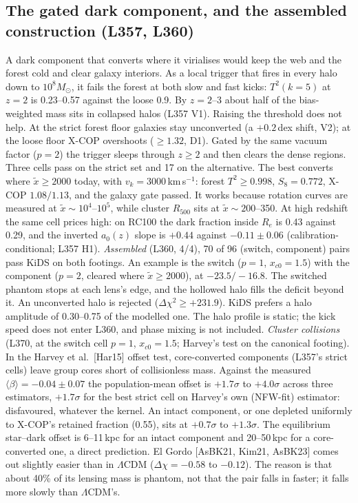 \documentclass[10pt]{article}
\begin{document}
\subsection{The gated dark component, and the assembled construction (L357, L360)}
A dark component that converts where it virialises would keep the web and the forest cold and clear galaxy interiors. As a local trigger that fires in every halo down to $10^8M_\odot$, it fails the forest at both slow and fast kicks: $T^2(k=5)$ at $z=2$ is 0.23--0.57 against the loose 0.9. By $z=2$--3 about half of the bias-weighted mass sits in collapsed halos (L357 V1). Raising the threshold does not help. At the strict forest floor galaxies stay unconverted (a $+0.2$\,dex shift, V2); at the loose floor X-COP overshoots ($\geq1.32$, D1).
Gated by the same vacuum factor ($p=2$) the trigger sleeps through $z\geq2$ and then clears the dense regions. Three cells pass on the strict set and 17 on the alternative. The best converts where $\tilde x\geq2000$ today, with $v_k=3000$\,km\,s$^{-1}$: forest $T^2\geq0.998$, $S_8=0.772$, X-COP $1.08/1.13$, and the galaxy gate passed. It works because rotation curves are measured at $\tilde x\sim10^4$--$10^5$, while cluster $R_{500}$ sits at $\tilde x\sim200$--350. At high redshift the same cell prices high: on RC100 the dark fraction inside $R_e$ is 0.43 against 0.29, and the inverted $a_0(z)$ slope is $+0.44$ against $-0.11\pm0.06$ (calibration-conditional; L357 H1).
\emph{Assembled} (L360, 4/4), 70 of 96 (switch, component) pairs pass KiDS on both footings. An example is the switch ($p=1$, $x_{c0}=1.5$) with the component ($p=2$, cleared where $\tilde x\geq2000$), at $-23.5/-16.8$. The switched phantom stops at each lens's edge, and the hollowed halo fills the deficit beyond it. An unconverted halo is rejected ($\Delta\chi^2\geq+231.9$). KiDS prefers a halo amplitude of 0.30--0.75 of the modelled one. The halo profile is static; the kick speed does not enter L360, and phase mixing is not included.
\emph{Cluster collisions} (L370, at the switch cell $p=1$, $x_{c0}=1.5$; Harvey's test on the canonical footing). In the Harvey et al.\ [Har15] offset test, core-converted components (L357's strict cells) leave group cores short of collisionless mass. Against the measured $\langle\beta\rangle=-0.04\pm0.07$ the population-mean offset is $+1.7\sigma$ to $+4.0\sigma$ across three estimators, $+1.7\sigma$ for the best strict cell on Harvey's own (NFW-fit) estimator: disfavoured, whatever the kernel. An intact component, or one depleted uniformly to X-COP's retained fraction (0.55), sits at $+0.7\sigma$ to $+1.3\sigma$. The equilibrium star--dark offset is 6--11\,kpc for an intact component and 20--50\,kpc for a core-converted one, a direct prediction. El Gordo [AsBK21, Kim21, AsBK23] comes out slightly easier than in $\Lambda$CDM ($\Delta\chi=-0.58$ to $-0.12$). The reason is that about 40\% of its lensing mass is phantom, not that the pair falls in faster; it falls more slowly than $\Lambda$CDM's.
\end{document}
